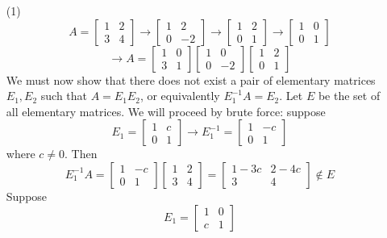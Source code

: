 \begin{itemize}
\item[(1)]
$$A = \begin{bmatrix}
1 & 2 \\
3 & 4
\end{bmatrix} \rightarrow \begin{bmatrix}
1 & 2 \\
0 & -2
\end{bmatrix} \rightarrow \begin{bmatrix}
1 & 2 \\
0 & 1
\end{bmatrix} \rightarrow \begin{bmatrix}
1 & 0 \\
0 & 1
\end{bmatrix}$$
$$\rightarrow A = \begin{bmatrix}
1 & 0 \\
3 & 1
\end{bmatrix}\begin{bmatrix}
1 & 0 \\
0 & -2
\end{bmatrix}\begin{bmatrix}
1 & 2 \\
0 & 1
\end{bmatrix}$$
We must now show that there does not exist a pair of elementary matrices $E_1, E_2$ such that $A = E_1E_2$, or equivalently $E_1^{-1}A = E_2$. Let $E$ be the set of all elementary matrices. We will proceed by brute force: suppose 
$$E_1 = \begin{bmatrix}
1 & c \\
0 & 1
\end{bmatrix} \rightarrow E_1^{-1} = \begin{bmatrix}
1 & -c \\
0 & 1
\end{bmatrix}$$
where $c \neq 0$. Then
$$E_1^{-1}A = \begin{bmatrix}
1 & -c \\
0 & 1
\end{bmatrix}\begin{bmatrix}
1 & 2 \\
3 & 4
\end{bmatrix} = \begin{bmatrix}
1 - 3c & 2 - 4c \\
3 & 4
\end{bmatrix} \not \in E$$
Suppose
$$E_1 = \begin{bmatrix}
1 & 0 \\
c & 1

\end{bmatrix}$$
\end{itemize}
